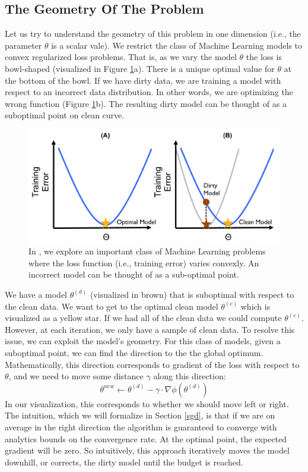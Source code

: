 \subsection{The Geometry Of The Problem}
Let us try to understand the geometry of this problem in one dimension (i.e., the parameter $\theta$ is a scalar vale).
We restrict the class of Machine Learning models to convex regularized loss problems.
That is, as we vary the model $\theta$ the loss is bowl-shaped (visualized in Figure \ref{update-arch2}a).
There is a unique optimal value for $\theta$ at the bottom of the bowl.
If we have dirty data, we are training a model with respect to an incorrect data distribution.
In other words, we are optimizing the wrong function (Figure \ref{update-arch2}b).
The resulting dirty model can be thought of as a suboptimal point on clean curve.

\begin{figure}[ht!]
\centering
 \includegraphics[width=\columnwidth]{figs/update-arch2.png}
 \caption{In \sys, we explore an important class of Machine Learning problems where the loss function (i.e., training error) varies convexly. An incorrect model can be thought of as a sub-optimal point. \label{update-arch2}}
\end{figure}

We have a model $\theta^{(d)}$ (visualized in brown) that is suboptimal with respect to the clean data.
We want to get to the optimal clean model $\theta^{(c)}$ which is visualized as a yellow star.
If we had all of the clean data we could compute $\theta^{(c)}$.
However, at each iteration, we only have a sample of clean data.
To resolve this issue, we can exploit the model's geometry.
For this class of models, given a suboptimal point, we can find the direction to the 
the global optimum.
Mathematically, this direction corresponds to gradient of the loss with respect to $\theta$, and we need to move some distance $\gamma$ along this direction:
\[
\theta^{new} \leftarrow \theta^{(d)} - \gamma \cdot \nabla\phi(\theta^{(d)})
\]
In our visualization, this corresponds to whether we should move left or right.
The intuition, which we will formalize in Section \ref{sgd}, is that if we are on average in the right direction the algorithm is guaranteed to converge with analytics bounds on the convergence rate.
At the optimal point, the expected gradient will be zero.
So intuitively, this approach iteratively moves the model downhill, or corrects, the dirty model until the budget is reached.

